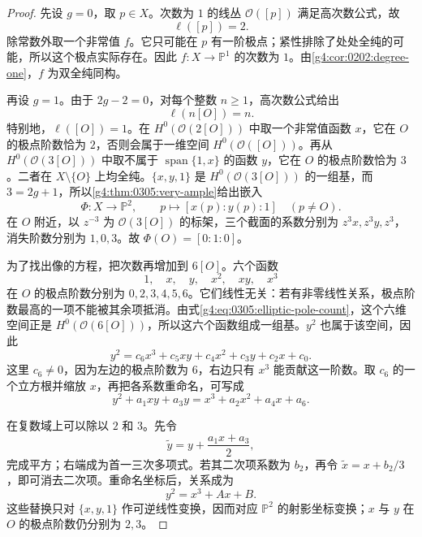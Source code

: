 \begin{proof}
	先设 \(g=0\)，取 \(p\in X\)。次数为 \(1\) 的线丛 \(\mathcal O([p])\) 满足高次数公式，故
	\[
		\ell([p])=2.
	\]
	除常数外取一个非常值 \(f\)。它只可能在 \(p\) 有一阶极点；紧性排除了处处全纯的可能，所以这个极点实际存在。因此 \(f:X\to\mathbb P^1\) 的次数为 \(1\)。由\cref{g4:cor:0202:degree-one}，\(f\) 为双全纯同构。

	再设 \(g=1\)。由于 \(2g-2=0\)，对每个整数 \(n\ge1\)，高次数公式给出
	\begin{equation}\label{g4:eq:0305:elliptic-pole-count}
		\ell(n[O])=n.
	\end{equation}
	特别地，\(\ell([O])=1\)。在 \(H^0(\mathcal O(2[O]))\) 中取一个非常值函数 \(x\)，它在 \(O\) 的极点阶数恰为 \(2\)，否则会属于一维空间 \(H^0(\mathcal O([O]))\)。再从 \(H^0(\mathcal O(3[O]))\) 中取不属于 \(\operatorname{span}\{1,x\}\) 的函数 \(y\)，它在 \(O\) 的极点阶数恰为 \(3\)。二者在 \(X\setminus\{O\}\) 上均全纯。\(\{x,y,1\}\) 是 \(H^0(\mathcal O(3[O]))\) 的一组基，而 \(3=2g+1\)，所以\cref{g4:thm:0305:very-ample}给出嵌入
	\[
		\Phi:X\longrightarrow\mathbb P^2,\qquad
		p\longmapsto[x(p):y(p):1]\quad(p\ne O).
	\]
	在 \(O\) 附近，以 \(z^{-3}\) 为 \(\mathcal O(3[O])\) 的标架，三个截面的系数分别为 \(z^3x,z^3y,z^3\)，消失阶数分别为 \(1,0,3\)。故 \(\Phi(O)=[0:1:0]\)。

	为了找出像的方程，把次数再增加到 \(6[O]\)。六个函数
	\[
		1,\quad x,\quad y,\quad x^2,\quad xy,\quad x^3
	\]
	在 \(O\) 的极点阶数分别为 \(0,2,3,4,5,6\)。它们线性无关：若有非零线性关系，极点阶数最高的一项不能被其余项抵消。由式\eqref{g4:eq:0305:elliptic-pole-count}，这个六维空间正是 \(H^0(\mathcal O(6[O]))\)，所以这六个函数组成一组基。\(y^2\) 也属于该空间，因此
	\[
		y^2=c_6x^3+c_5xy+c_4x^2+c_3y+c_2x+c_0.
	\]
	这里 \(c_6\ne0\)，因为左边的极点阶数为 \(6\)，右边只有 \(x^3\) 能贡献这一阶数。取 \(c_6\) 的一个立方根并缩放 \(x\)，再把各系数重命名，可写成
	\begin{equation}\label{g4:eq:0305:general-weierstrass}
		y^2+a_1xy+a_3y=x^3+a_2x^2+a_4x+a_6.
	\end{equation}

	在复数域上可以除以 \(2\) 和 \(3\)。先令
	\[
		\widetilde y=y+\frac{a_1x+a_3}{2},
	\]
	完成平方；右端成为首一三次多项式。若其二次项系数为 \(b_2\)，再令 \(\widetilde x=x+b_2/3\)，即可消去二次项。重命名坐标后，关系成为
	\begin{equation}\label{g4:eq:0305:affine-weierstrass}
		y^2=x^3+Ax+B.
	\end{equation}
	这些替换只对 \(\{x,y,1\}\) 作可逆线性变换，因而对应 \(\mathbb P^2\) 的射影坐标变换；\(x\) 与 \(y\) 在 \(O\) 的极点阶数仍分别为 \(2,3\)。


\end{proof}
